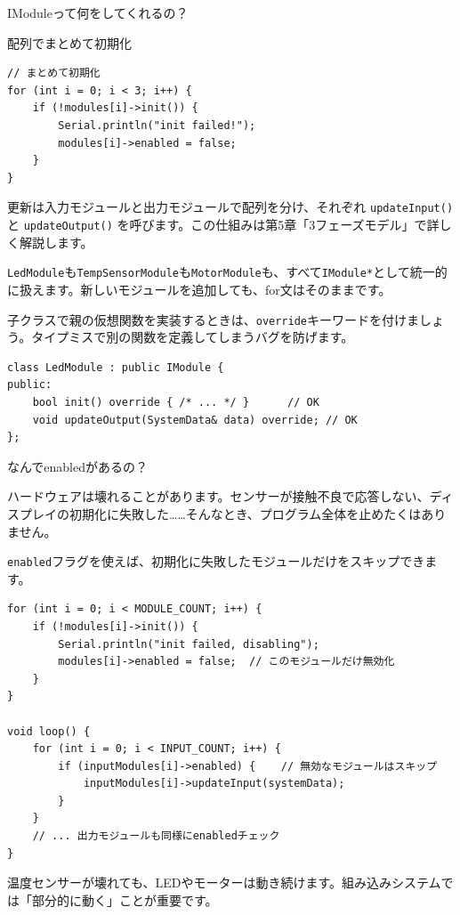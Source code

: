 \begin{qabox}{IModuleって何をしてくれるの？}
\begin{goodexample}{配列でまとめて初期化}
\begin{lstlisting}
// まとめて初期化
for (int i = 0; i < 3; i++) {
    if (!modules[i]->init()) {
        Serial.println("init failed!");
        modules[i]->enabled = false;
    }
}
\end{lstlisting}
\end{goodexample}

更新は入力モジュールと出力モジュールで配列を分け、それぞれ \texttt{updateInput()} と \texttt{updateOutput()} を呼びます。この仕組みは第5章「3フェーズモデル」で詳しく解説します。

\texttt{LedModule}も\texttt{TempSensorModule}も\texttt{MotorModule}も、すべて\texttt{IModule*}として統一的に扱えます。新しいモジュールを追加しても、for文はそのままです。

\begin{notebox}[overrideキーワード]
子クラスで親の仮想関数を実装するときは、\texttt{override}キーワードを付けましょう。タイプミスで別の関数を定義してしまうバグを防げます。
\begin{lstlisting}
class LedModule : public IModule {
public:
    bool init() override { /* ... */ }      // OK
    void updateOutput(SystemData& data) override; // OK
};
\end{lstlisting}
\end{notebox}

\end{qabox}

\begin{qabox}{なんでenabledがあるの？}

ハードウェアは壊れることがあります。センサーが接触不良で応答しない、ディスプレイの初期化に失敗した……そんなとき、プログラム全体を止めたくはありません。

\texttt{enabled}フラグを使えば、初期化に失敗したモジュールだけをスキップできます。

\begin{lstlisting}
for (int i = 0; i < MODULE_COUNT; i++) {
    if (!modules[i]->init()) {
        Serial.println("init failed, disabling");
        modules[i]->enabled = false;  // このモジュールだけ無効化
    }
}

void loop() {
    for (int i = 0; i < INPUT_COUNT; i++) {
        if (inputModules[i]->enabled) {    // 無効なモジュールはスキップ
            inputModules[i]->updateInput(systemData);
        }
    }
    // ... 出力モジュールも同様にenabledチェック
}
\end{lstlisting}

温度センサーが壊れても、LEDやモーターは動き続けます。組み込みシステムでは「部分的に動く」ことが重要です。

\end{qabox}
